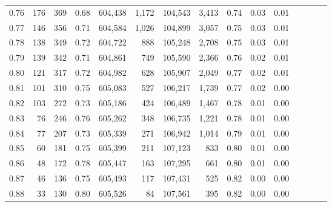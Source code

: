 \begin{tabular}{rrrcrrrrrrrrrrr}
0.76 &     176 &    369 &                                       0.68 &  604,438 &    1,172 &  104,543 &    3,413 &  0.74 &  0.03 &                         0.01 \\
0.77 &     146 &    356 &                                       0.71 &  604,584 &    1,026 &  104,899 &    3,057 &  0.75 &  0.03 &                         0.01 \\
0.78 &     138 &    349 &                                       0.72 &  604,722 &      888 &  105,248 &    2,708 &  0.75 &  0.03 &                         0.01 \\
0.79 &     139 &    342 &                                       0.71 &  604,861 &      749 &  105,590 &    2,366 &  0.76 &  0.02 &                         0.01 \\
0.80 &     121 &    317 &                                       0.72 &  604,982 &      628 &  105,907 &    2,049 &  0.77 &  0.02 &                         0.01 \\
0.81 &     101 &    310 &                                       0.75 &  605,083 &      527 &  106,217 &    1,739 &  0.77 &  0.02 &                         0.00 \\
0.82 &     103 &    272 &                                       0.73 &  605,186 &      424 &  106,489 &    1,467 &  0.78 &  0.01 &                         0.00 \\
0.83 &      76 &    246 &                                       0.76 &  605,262 &      348 &  106,735 &    1,221 &  0.78 &  0.01 &                         0.00 \\
0.84 &      77 &    207 &                                       0.73 &  605,339 &      271 &  106,942 &    1,014 &  0.79 &  0.01 &                         0.00 \\
0.85 &      60 &    181 &                                       0.75 &  605,399 &      211 &  107,123 &      833 &  0.80 &  0.01 &                         0.00 \\
0.86 &      48 &    172 &                                       0.78 &  605,447 &      163 &  107,295 &      661 &  0.80 &  0.01 &                         0.00 \\
0.87 &      46 &    136 &                                       0.75 &  605,493 &      117 &  107,431 &      525 &  0.82 &  0.00 &                         0.00 \\
0.88 &      33 &    130 &                                       0.80 &  605,526 &       84 &  107,561 &      395 &  0.82 &  0.00 &                         0.00 \\

\end{tabular}
